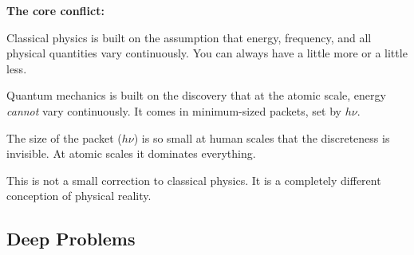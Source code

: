 \documentclass[12pt, a4paper]{book}
\begin{document}
\begin{crisisbox}
\textbf{The core conflict:}

Classical physics is built on the assumption that energy,
frequency, and all physical quantities vary continuously.
You can always have a little more or a little less.

Quantum mechanics is built on the discovery that at the atomic
scale, energy \emph{cannot} vary continuously.
It comes in minimum-sized packets, set by $h\nu$.

The size of the packet ($h\nu$) is so small
at human scales that the discreteness is invisible.
At atomic scales it dominates everything.

This is not a small correction to classical physics.
It is a completely different conception of physical reality.
\end{crisisbox}

\subsection*{Deep Problems}
\end{document}
